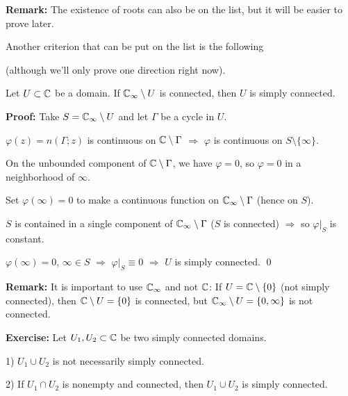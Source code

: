 \documentclass[10pt,aspectratio=169]{beamer}
\begin{document}
\begin{frame}

\textbf{Remark:} The existence of roots can also be on the list, but it will
be easier to prove later.

\medskip
\pause

Another criterion that can be put on the list is the following

(although we'll only prove one direction right now).

\pause

\begin{proposition}
Let $U \subset {\mathbb{C}}$ be a domain.  If
${\mathbb{C}}_\infty \setminus U$ is connected, then $U$ is simply connected.
\end{proposition}

\pause
\medskip

\textbf{Proof:}
Take $S = {\mathbb{C}}_\infty \setminus U$ and let $\Gamma$ be a cycle in $U$.

\medskip
\pause

$\varphi(z)= n(\Gamma;z)$ is continuous on ${\mathbb{C}} \setminus \Gamma$
\pause
\quad $\Rightarrow$ \quad $\varphi$ is continuous on $S \setminus \{ \infty \}$.

\medskip
\pause

On the unbounded component of ${\mathbb{C}} \setminus \Gamma$, we have $\varphi=0$,
so $\varphi=0$ in a neighborhood of $\infty$.

\medskip
\pause

Set $\varphi(\infty) = 0$ to make a continuous function on ${\mathbb{C}}_\infty
\setminus \Gamma$ (hence on $S$).

\medskip
\pause

$S$ is contained in a single component of 
${\mathbb{C}}_\infty \setminus \Gamma$ ($S$ is connected)
\pause \quad $\Rightarrow$ \quad so $\varphi|_S$ is
constant.

\medskip
\pause

$\varphi(\infty) = 0$, $\infty \in S$ \quad $\Rightarrow$ \quad $\varphi|_S \equiv 0$
\pause
\quad $\Rightarrow$ \quad
$U$ is simply connected.
\qed

\medskip
\pause

\textbf{Remark:}
It is important to use ${\mathbb{C}}_\infty$ and not ${\mathbb{C}}$:
\pause
If $U = {\mathbb{C}} \setminus \{ 0 \}$ (not simply connected),
then
${\mathbb{C}} \setminus U = \{ 0 \}$ is connected, but 
${\mathbb{C}}_\infty \setminus U = \{ 0, \infty \}$ is not connected.
\end{frame}


\begin{frame}

\textbf{Exercise:}
Let $U_1,U_2 \subset {\mathbb{C}}$ be two simply connected domains.

\medskip
\pause

1) $U_1 \cup U_2$ is not necessarily simply connected.

\medskip
\pause

2) If
$U_1 \cap U_2$ is nonempty and connected, then $U_1 \cup U_2$ is simply connected.


\end{frame}
\end{document}
